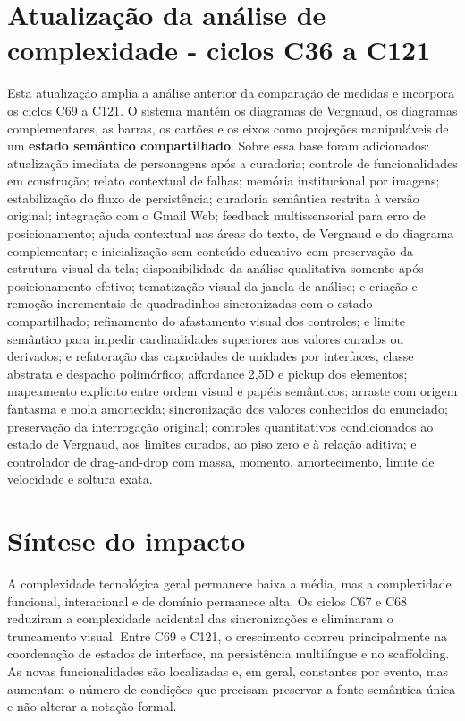 \documentclass[12pt,a4paper]{article}
\begin{document}
\section*{Atualização da análise de complexidade - ciclos C36 a C121}

Esta atualização amplia a análise anterior da comparação de medidas e incorpora os ciclos C69 a C121. O sistema mantém os diagramas de Vergnaud, os diagramas complementares, as barras, os cartões e os eixos como projeções manipuláveis de um \textbf{estado semântico compartilhado}. Sobre essa base foram adicionados: atualização imediata de personagens após a curadoria; controle de funcionalidades em construção; relato contextual de falhas; memória institucional por imagens; estabilização do fluxo de persistência; curadoria semântica restrita à versão original; integração com o Gmail Web; feedback multissensorial para erro de posicionamento; ajuda contextual nas áreas do texto, de Vergnaud e do diagrama complementar; e inicialização sem conteúdo educativo com preservação da estrutura visual da tela; disponibilidade da análise qualitativa somente após posicionamento efetivo; tematização visual da janela de análise; e criação e remoção incrementais de quadradinhos sincronizadas com o estado compartilhado; refinamento do afastamento visual dos controles; e limite semântico para impedir cardinalidades superiores aos valores curados ou derivados; e refatoração das capacidades de unidades por interfaces, classe abstrata e despacho polimórfico; affordance 2,5D e pickup dos elementos; mapeamento explícito entre ordem visual e papéis semânticos; arraste com origem fantasma e mola amortecida; sincronização dos valores conhecidos do enunciado; preservação da interrogação original; controles quantitativos condicionados ao estado de Vergnaud, aos limites curados, ao piso zero e à relação aditiva; e controlador de drag-and-drop com massa, momento, amortecimento, limite de velocidade e soltura exata.

\section{Síntese do impacto}

A complexidade tecnológica geral permanece baixa a média, mas a complexidade funcional, interacional e de domínio permanece alta. Os ciclos C67 e C68 reduziram a complexidade acidental das sincronizações e eliminaram o truncamento visual. Entre C69 e C121, o crescimento ocorreu principalmente na coordenação de estados de interface, na persistência multilíngue e no scaffolding. As novas funcionalidades são localizadas e, em geral, constantes por evento, mas aumentam o número de condições que precisam preservar a fonte semântica única e não alterar a notação formal.
\end{document}
